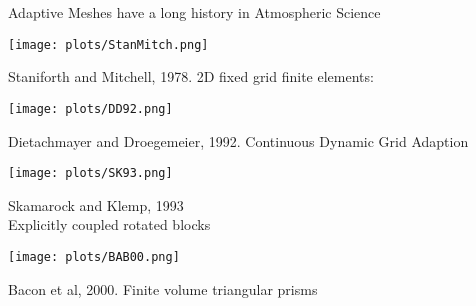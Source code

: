 \begin{slide}{Adaptive Meshes have a long history in Atmospheric Science}

\vspace{10pt}
\begin{minipage}{0.49\linewidth}\begin{minipage}{0.66\linewidth}
    \texttt{[image: plots/StanMitch.png]}
\end{minipage}\begin{minipage}{0.33\linewidth}\raggedright
    Staniforth and Mitchell, 1978. 2D fixed grid finite elements:
\end{minipage}\end{minipage}
%
\begin{minipage}{0.49\linewidth}\begin{minipage}{0.66\linewidth}
    \texttt{[image: plots/DD92.png]}
\end{minipage}\begin{minipage}{0.33\linewidth}\raggedright
    Dietachmayer and Droegemeier, 1992.
    Continuous Dynamic Grid Adaption \\
\end{minipage}\end{minipage}

\vspace{10pt}

\begin{minipage}{0.49\linewidth}\begin{minipage}{0.66\linewidth}
    \texttt{[image: plots/SK93.png]}
\end{minipage}\begin{minipage}{0.33\linewidth}\raggedright
    Skamarock and Klemp, 1993 \\
    Explicitly coupled rotated blocks
\end{minipage}\end{minipage}
%
\begin{minipage}{0.49\linewidth}\begin{minipage}{0.66\linewidth}
    \texttt{[image: plots/BAB00.png]}
\end{minipage}\begin{minipage}{0.33\linewidth}\raggedright
    Bacon et al, 2000. Finite volume triangular prisms
\end{minipage}\end{minipage}

\end{slide}

